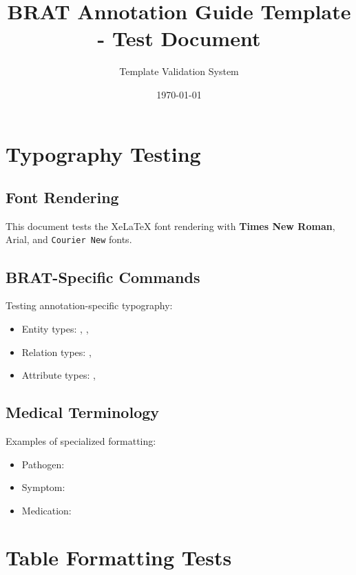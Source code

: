 \documentclass[11pt,a4paper]{article}
\title{BRAT Annotation Guide Template - Test Document}
\author{Template Validation System}
\date{\today}
\begin{document}

\tableofcontents
\newpage


\section{Typography Testing}

\subsection{Font Rendering}
This document tests the XeLaTeX font rendering with \textbf{Times New Roman}, \textsf{Arial}, and \texttt{Courier New} fonts.

\subsection{BRAT-Specific Commands}
Testing annotation-specific typography:
\begin{itemize}
    \item Entity types: , , 
    \item Relation types: , 
    \item Attribute types: , 
\end{itemize}

\subsection{Medical Terminology}
Examples of specialized formatting:
\begin{itemize}
    \item Pathogen: 
    \item Symptom: 
    \item Medication:  
\end{itemize}

\section{Table Formatting Tests}
\end{document}
